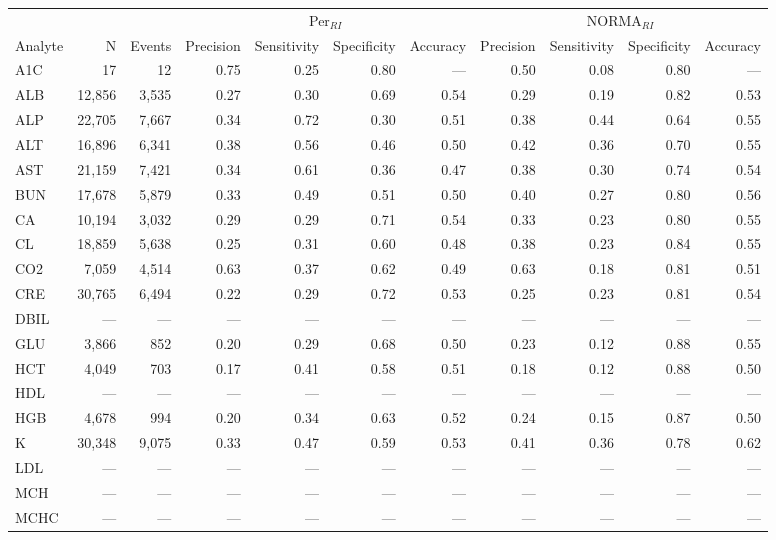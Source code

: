 \begin{table}[ht]
\centering
\footnotesize
\begin{tabular}{lrrrrrrrrrr}
\toprule
 & &  & \multicolumn{4}{c}{Per$_{RI}$} & \multicolumn{4}{c}{NORMA$_{RI}$} \\
\cmidrule(lr){4-7} \cmidrule(lr){8-11}
Analyte & N & Events & Precision & Sensitivity & Specificity & Accuracy & Precision & Sensitivity & Specificity & Accuracy \\
\midrule
A1C & 17 & 12 & 0.75 & 0.25 & 0.80 & --- & 0.50 & 0.08 & 0.80 & --- \\
ALB & 12,856 & 3,535 & 0.27 & 0.30 & 0.69 & 0.54 & 0.29 & 0.19 & 0.82 & 0.53 \\
ALP & 22,705 & 7,667 & 0.34 & 0.72 & 0.30 & 0.51 & 0.38 & 0.44 & 0.64 & 0.55 \\
ALT & 16,896 & 6,341 & 0.38 & 0.56 & 0.46 & 0.50 & 0.42 & 0.36 & 0.70 & 0.55 \\
AST & 21,159 & 7,421 & 0.34 & 0.61 & 0.36 & 0.47 & 0.38 & 0.30 & 0.74 & 0.54 \\
BUN & 17,678 & 5,879 & 0.33 & 0.49 & 0.51 & 0.50 & 0.40 & 0.27 & 0.80 & 0.56 \\
CA & 10,194 & 3,032 & 0.29 & 0.29 & 0.71 & 0.54 & 0.33 & 0.23 & 0.80 & 0.55 \\
CL & 18,859 & 5,638 & 0.25 & 0.31 & 0.60 & 0.48 & 0.38 & 0.23 & 0.84 & 0.55 \\
CO2 & 7,059 & 4,514 & 0.63 & 0.37 & 0.62 & 0.49 & 0.63 & 0.18 & 0.81 & 0.51 \\
CRE & 30,765 & 6,494 & 0.22 & 0.29 & 0.72 & 0.53 & 0.25 & 0.23 & 0.81 & 0.54 \\
DBIL & --- & --- & --- & --- & --- & --- & --- & --- & --- & --- \\
GLU & 3,866 & 852 & 0.20 & 0.29 & 0.68 & 0.50 & 0.23 & 0.12 & 0.88 & 0.55 \\
HCT & 4,049 & 703 & 0.17 & 0.41 & 0.58 & 0.51 & 0.18 & 0.12 & 0.88 & 0.50 \\
HDL & --- & --- & --- & --- & --- & --- & --- & --- & --- & --- \\
HGB & 4,678 & 994 & 0.20 & 0.34 & 0.63 & 0.52 & 0.24 & 0.15 & 0.87 & 0.50 \\
K & 30,348 & 9,075 & 0.33 & 0.47 & 0.59 & 0.53 & 0.41 & 0.36 & 0.78 & 0.62 \\
LDL & --- & --- & --- & --- & --- & --- & --- & --- & --- & --- \\
MCH & --- & --- & --- & --- & --- & --- & --- & --- & --- & --- \\
MCHC & --- & --- & --- & --- & --- & --- & --- & --- & --- & --- \\

\end{tabular}
\end{table}

